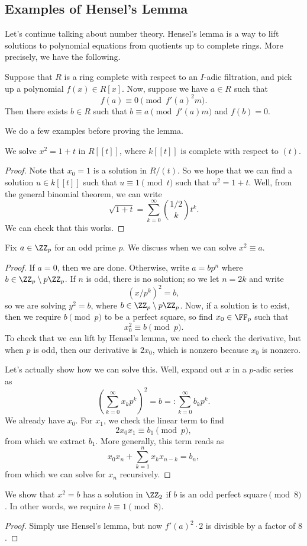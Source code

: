 \subsection{Examples of Hensel's Lemma}
Let's continue talking about number theory. Hensel's lemma is a way to lift solutions to polynomial equations from quotients up to complete rings. More precisely, we have the following.
\begin{theorem} \label{thm:hensel}
	Suppose that $R$ is a ring complete with respect to an $I$-adic filtration, and pick up a polynomial $f(x)\in R[x]$. Now, suppose we have $a\in R$ such that
	\[f(a)\equiv0\pmod{f'(a)^2m}.\]
	Then there exists $b\in R$ such that $b\equiv a\pmod{f'(a)m}$ and $f(b)=0$.
\end{theorem}
We do a few examples before proving the lemma.
\begin{exe}
	We solve $x^2=1+t$ in $R[[t]]$, where $k[[t]]$ is complete with respect to $(t)$.
\end{exe}
\begin{proof}
	Note that $x_0=1$ is a solution in $R/(t)$. So we hope that we can find a solution $u\in k[[t]]$ such that $u\equiv1\pmod t$ such that $u^2=1+t$. Well, from the general binomial theorem, we can write
	\[\sqrt{1+t}=\sum_{k=0}^\infty\binom{1/2}kt^k.\]
	We can check that this works.
\end{proof}
\begin{exe}
	Fix $a\in\ZZ_p$ for an odd prime $p$. We discuss when we can solve $x^2\equiv a$.
\end{exe}
\begin{proof}
	If $a=0$, then we are done. Otherwise, write $a=bp^n$ where $b\in\ZZ_p\setminus p\ZZ_p$. If $n$ is odd, there is no solution; so we let $n=2k$ and write
	\[\left(x/p^k\right)^2=b,\]
	so we are solving $y^2=b$, where $b\in\ZZ_p\setminus p\ZZ_p$. Now, if a solution is to exist, then we require $b\pmod p$ to be a perfect square, so find $x_0\in\FF_p$ such that 
	\[x_0^2\equiv b\pmod p.\]
	To check that we can lift by Hensel's lemma, we need to check the derivative, but when $p$ is odd, then our derivative is $2x_0$, which is nonzero because $x_0$ is nonzero.

	Let's actually show how we can solve this. Well, expand out $x$ in a $p$-adic series as
	\[\left(\sum_{k=0}^\infty x_kp^k\right)^2=b=:\sum_{k=0}^\infty b_kp^k.\]
	We already have $x_0$. For $x_1$, we check the linear term to find
	\[2x_0x_1\equiv b_1\pmod p,\]
	from which we extract $b_1$. More generally, this term reads as
	\[x_0x_n+\sum_{k=1}^nx_kx_{n-k}=b_n,\]
	from which we can solve for $x_n$ recursively.
\end{proof}
\begin{exe}
	We show that $x^2=b$ has a solution in $\ZZ_2$ if $b$ is an odd perfect square$\pmod8$. In other words, we require $b\equiv1\pmod8$.
\end{exe}
\begin{proof}
	Simply use Hensel's lemma, but now $f'(a)^2\cdot2$ is divisible by a factor of $8$.
\end{proof}

